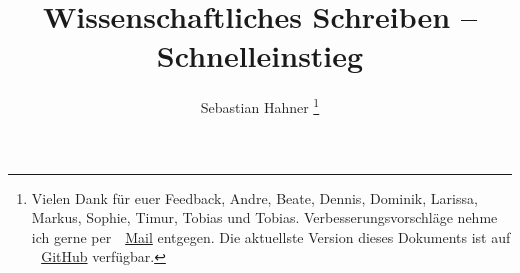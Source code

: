 \documentclass[10pt,journal,compsoc]{IEEEtran}
\begin{document}
\title{Wissenschaftliches Schreiben -- Schnelleinstieg}
\author{Sebastian Hahner
\thanks{Vielen Dank für euer Feedback, Andre, Beate, Dennis, Dominik, Larissa, Markus, Sophie, Timur, Tobias und Tobias. 
Verbesserungsvorschläge nehme ich gerne per \,\faEnvelope\ \href{mailto:hahner@kit.edu}{Mail} entgegen. 
Die aktuellste Version dieses Dokuments ist auf \,\faGithub~\href{https://github.com/sebinside}{GitHub} verfügbar.
}}


\maketitle



\printbibliography
\end{document}
